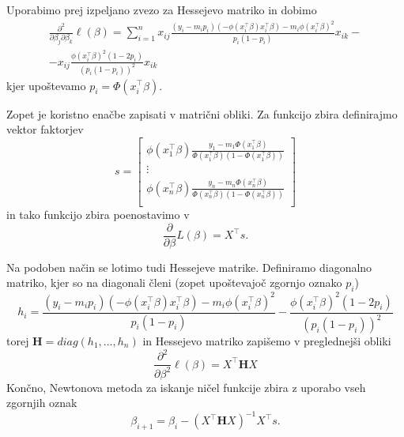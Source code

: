 \documentclass[12pt,a4paper]{amsart}
\theoremstyle{definition} %
\theoremstyle{plain} %
\begin{document}
Uporabimo prej izpeljano zvezo  za Hessejevo matriko in dobimo
\begin{multline*}
    \frac{\partial^2}{\partial\beta_{j}\partial\beta_{k}}\ell(\beta) = \sum_{i = 1}^{n}
    x_{ij}\frac{(y_{i}-m_{i}p_{i})(-\phi(x_{i}^\top\beta)x_{i}^\top\beta) - m_{i}\phi(x_{i}^\top\beta)^2}{p_{i}(1-p_{i})}x_{ik} - \\
    -x_{ij}\frac{\phi(x_{i}^\top\beta)^2(1-2p_{i})}{(p_{i}(1-p_{i}))^2}x_{ik}
\end{multline*}
kjer upoštevamo $p_{i} = \Phi(x_{i}^\top\beta).$

Zopet je koristno enačbe zapisati v matrični obliki. Za funkcijo zbira definirajmo vektor faktorjev
\[
    s = \begin{bmatrix}
        \phi(x_{1}^\top\beta)\frac{y_{1}-m_{1}\Phi(x_{1}^\top\beta)}{\Phi(x_{1}^\top\beta)(1-\Phi(x_{1}^\top\beta))} \\
        \vdots \\
        \phi(x_{n}^\top\beta)\frac{y_{n}-m_{n}\Phi(x_{n}^\top\beta)}{\Phi(x_{n}^\top\beta)(1-\Phi(x_{n}^\top\beta))} \\
    \end{bmatrix}
\]
in tako funkcijo zbira poenostavimo v
\[
    \frac{\partial}{\partial\beta}L(\beta) = X^\top s.
\]

Na podoben način se lotimo tudi Hessejeve matrike. Definiramo diagonalno matriko, kjer so na diagonali členi (zopet upoštevajoč zgornjo oznako $p_{i}$)
\[
    h_{i} = \frac{(y_{i}-m_{i}p_{i})(-\phi(x_{i}^\top\beta)x_{i}^\top\beta) - m_{i}\phi(x_{i}^\top\beta)^2}{p_{i}(1-p_{i})}
    -\frac{\phi(x_{i}^\top\beta)^2(1-2p_{i})}{(p_{i}(1-p_{i}))^2}
\]
torej $\mathbf{H} = diag(h_{1},\ldots,h_{n})$ in Hessejevo matriko zapišemo v preglednejši obliki
\[
    \frac{\partial^2}{\partial\beta^2} \ell(\beta) = X^\top \mathbf{H}X
\]
Končno, Newtonova metoda za iskanje ničel funkcije zbira z uporabo vseh zgornjih oznak
\begin{equation}
    \beta_{i+1} = \beta_{i} - (X^\top \mathbf{H} X)^{-1}X^\top s.
\end{equation}
\end{document}
